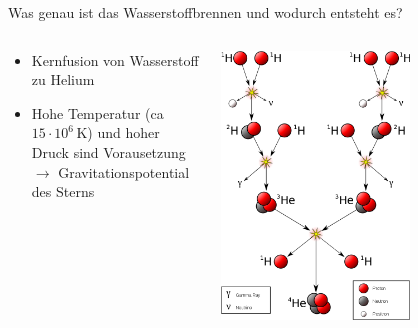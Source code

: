 \begin{frame}{Was genau ist das Wasserstoffbrennen und wodurch entsteht es?}
  \begin{columns}
    \begin{column}{0.5\textwidth}
\begin{itemize}  \setlength\itemsep{2em}
  \item Kernfusion von Wasserstoff zu Helium
  \item Hohe Temperatur (ca $15\cdot10^6\,\text{K}$) und hoher Druck sind Vorausetzung\\
  $\rightarrow$ Gravitationspotential des Sterns
\end{itemize}
    \end{column}
    \begin{column}{0.5\textwidth}
  \includegraphics[width=0.65\textwidth]{images/wasserstoff.png}
    \end{column}
  \end{columns}
\end{frame}

